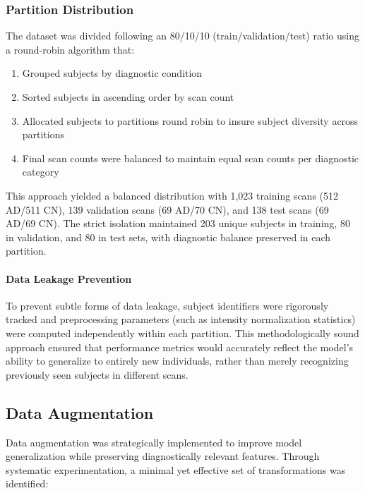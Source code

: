 \documentclass[12pt, a4paper]{article}
\begin{document}
\subsubsection{Partition Distribution}

The dataset was divided following an 80/10/10 (train/validation/test) ratio using a round-robin algorithm that:
\begin{enumerate}
    \item Grouped subjects by diagnostic condition
    \item Sorted subjects in ascending order by scan count
    \item Allocated subjects to partitions round robin to insure subject diversity across partitions
    \item Final scan counts were balanced to maintain equal scan counts per diagnostic category
\end{enumerate}

This approach yielded a balanced distribution with 1,023 training scans (512 AD/511 CN), 139 validation scans (69 AD/70 CN), and 138 test scans (69 AD/69 CN). The strict isolation maintained 203 unique subjects in training, 80 in validation, and 80 in test sets, with diagnostic balance preserved in each partition.

\paragraph{Data Leakage Prevention}

To prevent subtle forms of data leakage, subject identifiers were rigorously tracked and preprocessing parameters (such as intensity normalization statistics) were computed independently within each partition. This methodologically sound approach ensured that performance metrics would accurately reflect the model's ability to generalize to entirely new individuals, rather than merely recognizing previously seen subjects in different scans.

\subsection{Data Augmentation}

Data augmentation was strategically implemented to improve model generalization while preserving diagnostically relevant features. Through systematic experimentation, a minimal yet effective set of transformations was identified:
\end{document}
